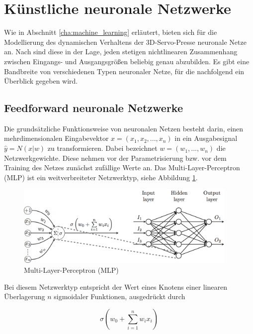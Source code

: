 \section{Künstliche neuronale Netzwerke}

Wie in Abschnitt \ref{cha:machine_learning} erläutert, bieten sich für die Modellierung des dynamischen Verhaltens der 3D-Servo-Presse neuronale Netze an. Nach \cite{Lipton.5292015} sind diese in der Lage, jeden stetigen nichtlinearen Zusammenhang zwischen Eingangs- und Ausgangsgrößen beliebig genau abzubilden. Es gibt eine Bandbreite von verschiedenen Typen neuronaler Netze, für die nachfolgend ein Überblick gegeben wird. 

\subsection{Feedforward neuronale Netzwerke}

Die grundsätzliche Funktionsweise von neuronalen Netzen besteht darin, einen mehrdimensionalen Eingabevektor $x = (x_1,x_2,...,x_n)$ in ein Ausgabesignal $\hat{y} = N(x|w)$ zu transformieren. Dabei bezeichnet $w = (w_1,...,w_n)$ die Netzwerkgewichte. Diese nehmen vor der Parametrisierung bzw. vor dem Training des Netzes zunächst zufällige Werte an. Das Multi-Layer-Perceptron (MLP) ist ein weitverbreiteter Netzwerktyp, siehe Abbildung \ref{fig:mlp}. 

\begin{figure} 
	\centering
	\includegraphics[width=0.95\textwidth]{images/MLP}
	\caption{Multi-Layer-Perceptron (MLP) \cite{Velickovic.2018}}
	\label{fig:mlp}
\end{figure}


Bei diesem Netzwerktyp entspricht der Wert eines Knotens einer linearen Überlagerung $n$ sigmoidaler Funktionen, ausgedrückt durch 

\begin{equation} 
\label{eq:feedforward}
\sigma(w_0 + \sum_{i=1}^{n} w_i x_i)
\end{equation}

